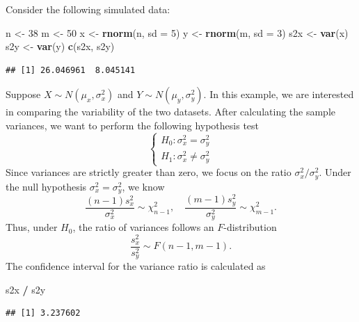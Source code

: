 \documentclass[
]{article}
\newenvironment{Shaded}{\begin{snugshade}}{\end{snugshade}}
\newcommand{\AttributeTok}[1]{\textcolor[rgb]{0.13,0.29,0.53}{#1}}
\newcommand{\DecValTok}[1]{\textcolor[rgb]{0.00,0.00,0.81}{#1}}
\newcommand{\FunctionTok}[1]{\textcolor[rgb]{0.13,0.29,0.53}{\textbf{#1}}}
\newcommand{\NormalTok}[1]{#1}
\newcommand{\OtherTok}[1]{\textcolor[rgb]{0.56,0.35,0.01}{#1}}
\newcommand{\SpecialCharTok}[1]{\textcolor[rgb]{0.81,0.36,0.00}{\textbf{#1}}}
\begin{document}
Consider the following simulated data:

\begin{Shaded}
\begin{Highlighting}[]
\NormalTok{n }\OtherTok{\textless{}{-}} \DecValTok{38}
\NormalTok{m }\OtherTok{\textless{}{-}} \DecValTok{50}
\NormalTok{x }\OtherTok{\textless{}{-}} \FunctionTok{rnorm}\NormalTok{(n, }\AttributeTok{sd =} \DecValTok{5}\NormalTok{)}
\NormalTok{y }\OtherTok{\textless{}{-}} \FunctionTok{rnorm}\NormalTok{(m, }\AttributeTok{sd =} \DecValTok{3}\NormalTok{)}
\NormalTok{s2x }\OtherTok{\textless{}{-}} \FunctionTok{var}\NormalTok{(x)}
\NormalTok{s2y }\OtherTok{\textless{}{-}} \FunctionTok{var}\NormalTok{(y)}
\FunctionTok{c}\NormalTok{(s2x, s2y)}
\end{Highlighting}
\end{Shaded}

\begin{verbatim}
## [1] 26.046961  8.045141
\end{verbatim}

Suppose \(X \sim N(\mu_x, \sigma^2_x)\) and
\(Y \sim N(\mu_y, \sigma^2_y)\). In this example, we are interested in
comparing the variability of the two datasets. After calculating the
sample variances, we want to perform the following hypothesis test \[
\begin{cases}
H_0: \sigma_x^2 = \sigma_y^2 \\
H_1: \sigma_x^2 \neq \sigma_y^2
\end{cases}
\] Since variances are strictly greater than zero, we focus on the ratio
\(\sigma_x^2 / \sigma_y^2\). Under the null hypothesis
\(\sigma_x^2 = \sigma_y^2\), we know \[
\frac{(n-1)s_x^2}{\sigma_x^2} \sim \chi^2_{n-1}, \quad 
\frac{(m-1)s_y^2}{\sigma_y^2} \sim \chi^2_{m-1}.
\] Thus, under \(H_0\), the ratio of variances follows an
\(F\)-distribution \[
\frac{s_x^2}{s_y^2} \sim F(n-1, m-1).
\] The confidence interval for the variance ratio is calculated as

\begin{Shaded}
\begin{Highlighting}[]
\NormalTok{s2x }\SpecialCharTok{/}\NormalTok{ s2y}
\end{Highlighting}
\end{Shaded}

\begin{verbatim}
## [1] 3.237602
\end{verbatim}
\end{document}
